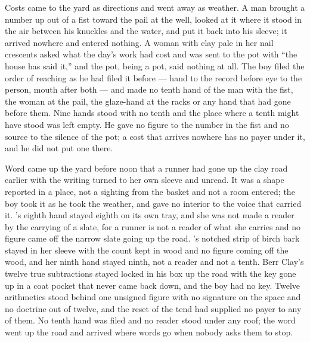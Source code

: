 Costs came to the yard as directions and went away as weather. A man brought a number up out of a fist toward the pail at the well, looked at it where it stood in the air between his knuckles and the water, and put it back into his sleeve; it arrived nowhere and entered nothing. A woman with clay pale in her nail crescents asked what the day's work had cost and was sent to the pot with “the house has said it,” and the pot, being a pot, said nothing at all. The boy filed the order of reaching as he had filed it before --- hand to the record before eye to the person, mouth after both --- and made no tenth hand of the man with the fist, the woman at the pail, the glaze-hand at the racks or any hand that had gone before them. Nine hands stood with no tenth and the place where a tenth might have stood was left empty. He gave no figure to the number in the fist and no source to the silence of the pot; a cost that arrives nowhere has no payer under it, and he did not put one there.

Word came up the yard before noon that a runner had gone up the clay road earlier with the writing turned to her own sleeve and unread. It was a shape reported in a place, not a sighting from the basket and not a room entered; the boy took it as he took the weather, and gave no interior to the voice that carried it. 's eighth hand stayed eighth on its own tray, and she was not made a reader by the carrying of a slate, for a runner is not a reader of what she carries and no figure came off the narrow slate going up the road. 's notched strip of birch bark stayed in her sleeve with the count kept in wood and no figure coming off the wood, and her ninth hand stayed ninth, not a reader and not a tenth. Berr Clay's twelve true subtractions stayed locked in his box up the road with the key gone up in a coat pocket that never came back down, and the boy had no key. Twelve arithmetics stood behind one unsigned figure with no signature on the space and no doctrine out of twelve, and the reset of the tend had supplied no payer to any of them. No tenth hand was filed and no reader stood under any roof; the word went up the road and arrived where words go when nobody asks them to stop.

\scenebreak

